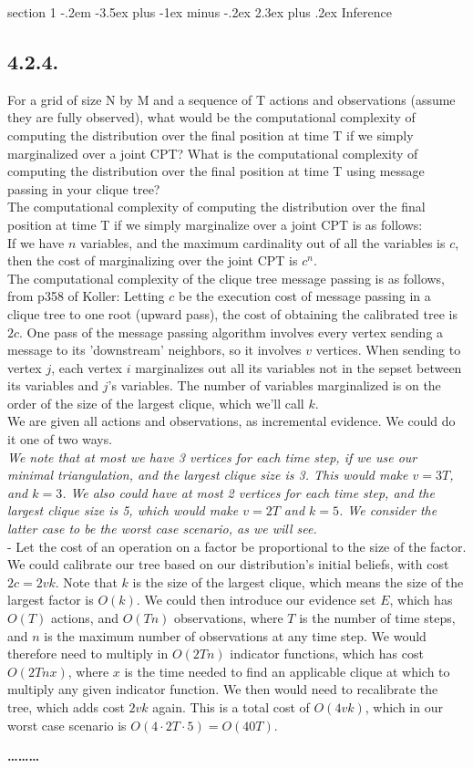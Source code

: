 \documentclass[12pt]{article}
\makeatletter
\newenvironment{problem}{\@startsection
       {section}
       {1}
       {-.2em}
       {-3.5ex plus -1ex minus -.2ex}
       {2.3ex plus .2ex}
       {\pagebreak[3]%
       \large\bf\noindent{Problem }
       }
       }
       {%
       \begin{center}\large\bf \ldots\ldots\ldots\end{center}}
\makeatother
\begin{document}
\begin{problem}{Inference}
\subsection*{4.2.4.}

\noindent For a grid of size N by M and a sequence of T actions and observations (assume they are fully observed), what would be the computational complexity of computing the distribution over the final position at time T if we simply marginalized over a joint CPT?
What is the computational complexity of computing the distribution over the final position at time T using message passing in your clique tree?\\
The computational complexity of computing the distribution over the final position at time T if we simply marginalize over a joint CPT is as follows:\\
If we have $n$ variables, and the maximum cardinality out of all the variables is $c$, then the cost of marginalizing over the joint CPT is $c^n$.\\
The computational complexity of the clique tree message passing is as follows, from p358 of Koller:
Letting $c$ be the execution cost of message passing in a clique tree to one root (upward pass), the cost of obtaining the calibrated tree is $2c$.  One pass of the message passing algorithm involves every vertex sending a message to its 'downstream' neighbors, so it involves $v$ vertices.  When sending to vertex $j$, each vertex $i$ marginalizes out all its variables not in the sepset between its variables and $j$'s variables.  The number of variables marginalized is on the order of the size of the largest clique, which we'll call $k$.\\
We are given all actions and observations, as incremental evidence.  We could do it one of two ways.\\
\textit{We note that at most we have 3 vertices for each time step, if we use our minimal triangulation, and the largest clique size is 3.  This would make $v = 3T$, and $k = 3$.  We also could have at most 2 vertices for each time step, and the largest clique size is 5, which would make $v = 2T$ and $k = 5$.  We consider the latter case to be the worst case scenario, as we will see.}\\
\noindent - Let the cost of an operation on a factor be proportional to the size of the factor.  We could calibrate our tree based on our distribution's initial beliefs, with cost $2c = 2vk$.  Note that $k$ is the size of the largest clique, which means the size of the largest factor is $O(k)$.  We could then introduce our evidence set $E$, which has $O(T)$ actions, and $O(T n)$ observations, where $T$ is the number of time steps, and $n$ is the maximum number of observations at any time step.  We would therefore need to multiply in $O(2 T n)$ indicator functions, which has cost $O(2 T n x)$, where $x$ is the time needed to find an applicable clique at which to multiply any given indicator function.  We then would need to recalibrate the tree, which adds cost $2 v k$ again.  This is a total cost of $O(4 v k)$, which in our worst case scenario is $O(4 \cdot 2T \cdot 5) = O(40T)$.\\

\end{problem}
\end{document}
